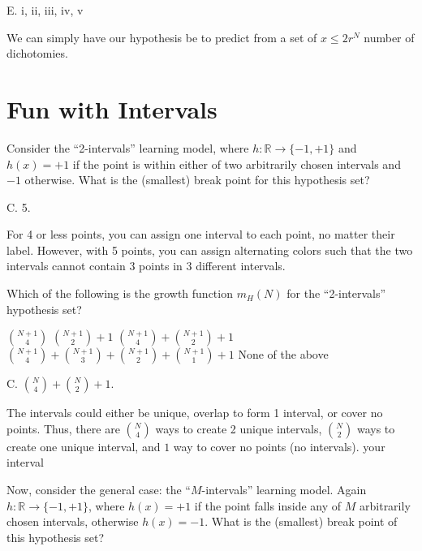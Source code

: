 \documentclass[answers]{exam}
\begin{document}
\begin{questions}
\begin{solution}
E. i, ii, iii, iv, v

We can simply have our hypothesis be to predict from a set of $x \le 2r^{N}$ number 
of dichotomies.
\end{solution}

\section*{Fun with Intervals}

\question
Consider the “2-intervals” learning model, where $h: \mathbb{R} \to 
\{-1,+1\}$ and $h(x) = +1$ if the point is within either of two 
arbitrarily chosen intervals and $-1$ otherwise. What is the (smallest) 
break point for this hypothesis set?

\begin{choices}
\end{choices}

\begin{solution}
C. 5.

For 4 or less points, you can assign one interval to each point, no matter
their label. However, with 5 points, you can assign alternating colors
such that the two intervals cannot contain 3 points in 3 different intervals.
\end{solution}

\question
Which of the following is the growth function $m_H(N)$ for the 
“2-intervals” hypothesis set?

\begin{choices}
    \choice $\binom{N+1}{4}$
    \choice $\binom{N+1}{2} + 1$
    \choice $\binom{N+1}{4} + \binom{N+1}{2} + 1$
    \choice $\binom{N+1}{4} + \binom{N+1}{3} + \binom{N+1}{2} + 
    \binom{N+1}{1} + 1$
    \choice None of the above
\end{choices}

\begin{solution}
C. $\binom{N}{4} + \binom{N}{2} + 1$.

The intervals could either be unique, overlap to form 1 interval,
or cover no points. Thus, there are $\binom{N}{4}$ ways to create
2 unique intervals, $\binom{N}{2}$ ways to create one unique interval,
and $1$ way to cover no points (no intervals).
your interval
\end{solution}

\question
Now, consider the general case: the “$M$-intervals” learning model. 
Again $h : \mathbb{R} \to \{-1,+1\}$, where $h(x) = +1$ if the point 
falls inside any of $M$ arbitrarily chosen intervals, otherwise $h(x) = 
-1$. What is the (smallest) break point of this hypothesis set?


\end{questions}
\end{document}
